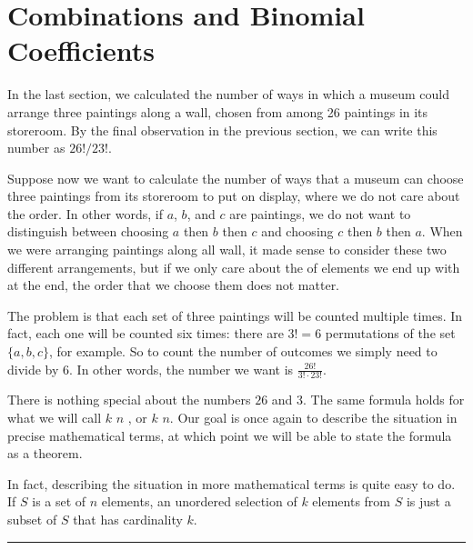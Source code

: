 \documentclass[letterpaper,10pt,english]{sphinxmanual}
\begin{document}
\section{Combinations and Binomial Coefficients}
\label{\detokenize{combinatorics:combinations-and-binomial-coefficients}}\label{\detokenize{combinatorics:id3}}
\sphinxAtStartPar
In the last section, we calculated the number of ways in which a museum could arrange three paintings along a wall, chosen from among 26 paintings in its storeroom. By the final observation in the previous section, we can write this number as \(26! / 23!\).

\sphinxAtStartPar
Suppose now we want to calculate the number of ways that a museum can choose three paintings from its storeroom to put on display, where we do not care about the order. In other words, if \(a\), \(b\), and \(c\) are paintings, we do not want to distinguish between choosing \(a\) then \(b\) then \(c\) and choosing \(c\) then \(b\) then \(a\). When we were arranging paintings along all wall, it made sense to consider these two different arrangements, but if we only care about the  of elements we end up with at the end, the order that we choose them does not matter.

\sphinxAtStartPar
The problem is that each set of three paintings will be counted multiple times. In fact, each one will be counted six times: there are \(3! = 6\) permutations of the set \(\{a, b, c\}\), for example. So to count the number of outcomes we simply need to divide by 6. In other words, the number we want is \(\frac{26!}{3! \cdot 23!}\).

\sphinxAtStartPar
There is nothing special about the numbers \(26\) and \(3\). The same formula holds for what we will call  \(k\)  \(n\) , or \(k\)\sphinxhyphen{} \(n\)\sphinxhyphen{}. Our goal is once again to describe the situation in precise mathematical terms, at which point we will be able to state the formula as a theorem.

\sphinxAtStartPar
In fact, describing the situation in more mathematical terms is quite easy to do. If \(S\) is a set of \(n\) elements, an unordered selection of \(k\) elements from \(S\) is just a subset of \(S\) that has cardinality \(k\).


\bigskip\hrule\bigskip
\end{document}
